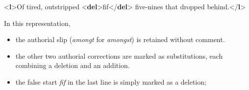 \begin{shaded}
{<\textbf{l}>}Of tired, outstripped {<\textbf{del}>}fif{</\textbf{del}>} five-nines that dropped\mbox{}\newline 
 behind.{</\textbf{l}>}\end{shaded}\egroup\par \noindent  In this representation, \begin{itemize}
\item the authorial slip (\textit{amongt} for \textit{amongst}) is retained without comment.
\item the other two authorial corrections are marked as substitutions, each combining a deletion and an addition. 
\item the false start \textit{fif} in the last line is simply marked as a deletion;
\end{itemize} \par
